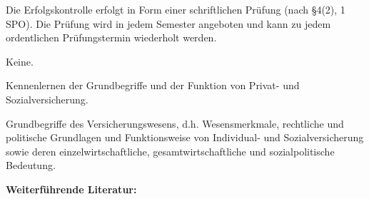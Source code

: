 \begin{course}

\setdoclanguagegerman
{}



\coursehead


\label{cour_6369.dp_997}


\begin{styleenv}
\begin{assessment}
Die Erfolgskontrolle erfolgt in Form einer schriftlichen Prüfung (nach §4(2), 1 SPO). Die Prüfung wird in jedem Semester angeboten und kann zu jedem ordentlichen Prüfungstermin wiederholt werden.


\end{assessment}

\begin{conditions}Keine.\end{conditions}


\end{styleenv}

\begin{learningoutcomes}
Kennenlernen der Grundbegriffe und der Funktion von Privat- und Sozialversicherung.


\end{learningoutcomes}

\begin{content}
Grundbegriffe des Versicherungswesens, d.h. Wesensmerkmale, rechtliche und politische Grundlagen und Funktionsweise von Individual- und Sozialversicherung sowie deren einzelwirtschaftliche, gesamtwirtschaftliche und sozialpolitische Bedeutung.


\end{content}



\begin{literature}\textbf{Weiterführende Literatur:}


\end{literature}
\end{course}
